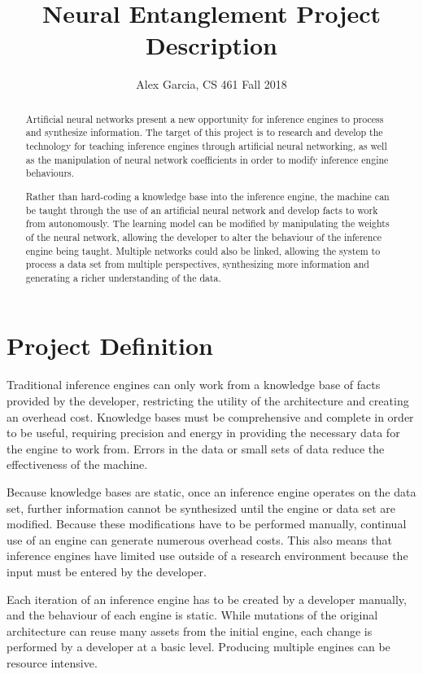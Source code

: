 \documentclass[onecolumn, draftclsnofoot,10pt, compsoc]{IEEEtran}
\title{Neural Entanglement Project Description}
\author{Alex Garcia, CS 461 Fall 2018}
\begin{document}
\maketitle
    \begin{abstract}
    Artificial neural networks present a new opportunity for inference engines to process and synthesize information. The target of this project is to research and develop the technology for teaching inference engines through artificial neural networking, as well as the manipulation of neural network coefficients in order to modify inference engine behaviours.
    
    Rather than hard-coding a knowledge base into the inference engine, the machine can be taught through the use of an artificial neural network and develop facts to work from autonomously. The learning model can be modified by manipulating the weights of the neural network, allowing the developer to alter the behaviour of the inference engine being taught. Multiple networks could also be linked, allowing the system to process a data set from multiple perspectives, synthesizing more information and generating a richer understanding of the data.
    \end{abstract}
    
    \section{Project Definition}
    Traditional inference engines can only work from a knowledge base of facts provided by the developer, restricting the utility of the architecture and creating an overhead cost. Knowledge bases must be comprehensive and complete in order to be useful, requiring precision and energy in providing the necessary data for the engine to work from. Errors in the data or small sets of data reduce the effectiveness of the machine.
    
    Because knowledge bases are static, once an inference engine operates on the data set, further information cannot be synthesized until the engine or data set are modified. Because these modifications have to be performed manually, continual use of an engine can generate numerous overhead costs. This also means that inference engines have limited use outside of a research environment because the input must be entered by the developer.
    
    Each iteration of an inference engine has to be created by a developer manually, and the behaviour of each engine is static. While mutations of the original architecture can reuse many assets from the initial engine, each change is performed by a developer at a basic level. Producing multiple engines can be resource intensive.
    
\end{document}
